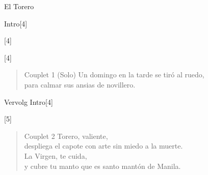 \begin{song}{El Torero}

\begin{instrumental}{Intro}[4]
 
\end{instrumental}
\begin{instrumental}{}[4]
 \measure{} \measure{} \measure{}
 \measure{}  \measure{}
 \measure{} \measure{} \measure{}
 \measure{} \measure{} \measure{}
\measure{} \measure{}  \measure{}
 \measure{} \measure*{}
\end{instrumental}
\begin{instrumental}{}[4]
 
 
\end{instrumental}

\begin{verse}{Couplet 1 \textnormal{(Solo)}}
 Un domingo en la tarde  se tiró al  ruedo,\\
para calmar sus ansias  de novillero.
\end{verse}

\begin{instrumental}{Vervolg Intro}[4]
 
 
\end{instrumental}
\begin{instrumental}{}[5]
 \measure{} \measure{}  
\end{instrumental}

\begin{verse}{Couplet 2}
Torero, valiente,\\
despliega el capote con arte sin miedo a la muerte.\\
La Virgen, te cuida,\\
y cubre tu manto que es santo mantón de Manila. 
\end{verse}


\end{song}
